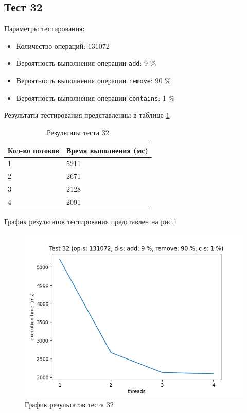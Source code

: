\subsection*{Тест 32}

Параметры тестирования:

\begin{itemize}
    \item Количество операций: 131072
    \item Вероятность выполнения операции \verb|add|: 9 \%
    \item Вероятность выполнения операции \verb|remove|: 90 \%
    \item Вероятность выполнения операции \verb|contains|: 1 \%
\end{itemize}

Результаты тестирования представленны в таблице \ref{tab:results32}


\begin{table}[H]
    \centering
    \begin{tabular}{|l|l|}
        \hline
        Кол-во потоков & Время выполнения (мс) \\
        \hline
        1 & 5211 \\
        \hline
        2 & 2671 \\
        \hline
        3 & 2128 \\
        \hline
        4 & 2091 \\
        \hline
    \end{tabular}
    \caption{Результаты теста 32}
    \label{tab:results32}
\end{table}
        

График результатов тестирования представлен на рис.\ref{fig:plot32}

\begin{figure}[H]
    \centering
    \includegraphics[width=0.7\linewidth]{photo/plot32}
    \caption{График результатов теста 32}
    \label{fig:plot32}
\end{figure}

